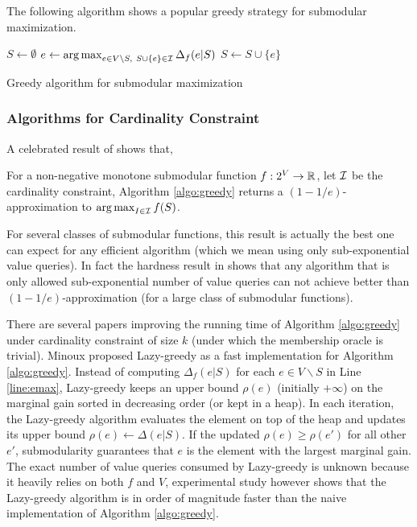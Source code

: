 The following algorithm shows a popular greedy strategy for submodular maximization.

\begin{algorithm}[H]
\DontPrintSemicolon %
$S \gets \emptyset$\;
 {
  $e \gets \operatorname*{arg\,max}_{e\in V\backslash S, ~S\cup\{e\}\in \mathcal{I}} \Delta_f(e|S)$\;\label{line:emax}
  $S \gets S\cup \{e\}$\;
}
\;
\caption{{\sc Greedy} algorithm for submodular maximization}
\label{algo:greedy}
\end{algorithm}


\subsubsection{Algorithms for Cardinality Constraint}


A celebrated result of \cite{NWF78} shows that,
\begin{theorem}
  \label{thm:1978}
  For a non-negative monotone submodular function $f: 2^V \rightarrow \mathbb{R}$, let $\mathcal{I}$ be the cardinality constraint, Algorithm \ref{algo:greedy} returns a $(1 - 1/e)$-approximation to $\operatorname*{arg\,max}_{I\in \mathcal{I}} f(S)$.
\end{theorem}
For several classes of submodular functions, this result is actually the best one can expect for any efficient algorithm (which we mean using only sub-exponential value queries). In fact the hardness result in \cite{NWF78,F98} shows that any algorithm that is only allowed sub-exponential number of value queries can not achieve better than $(1 - 1/e)$-approximation (for a large class of submodular functions).

There are several papers improving the running time of Algorithm \ref{algo:greedy} under cardinality constraint of size $k$ (under which the membership oracle is trivial). Minoux \cite{M78} proposed {\sc Lazy-greedy} as a fast implementation for Algorithm \ref{algo:greedy}. Instead of computing $\Delta_f(e|S)$ for each $e\in V\backslash S$ in Line \ref{line:emax},  {\sc Lazy-greedy} keeps an upper bound $\rho(e)$ (initially $+\infty$) on the marginal gain sorted in decreasing order (or kept in a heap). In each iteration, the {\sc Lazy-greedy} algorithm evaluates the element on top of the heap and updates its upper bound $\rho(e) \gets \Delta(e|S)$. If the updated $\rho(e) \geq \rho(e')$ for all other $e'$, submodularity guarantees that $e$ is the element with the largest marginal gain. The exact number of value queries consumed by {\sc Lazy-greedy} is unknown because it heavily relies on both $f$ and $V$, experimental study however shows that the {\sc Lazy-greedy} algorithm is in order of magnitude faster than the naive implementation of Algorithm \ref{algo:greedy}.  

